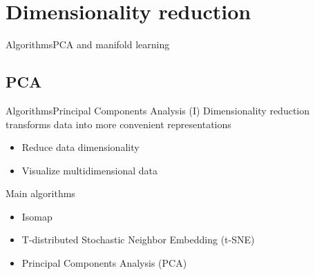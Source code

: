 \documentclass[10pt,compress]{beamer} %
\begin{document}
\section{Dimensionality reduction}
{
\sectionheaderWhite %
\begin{frame}{Algorithms}{PCA and manifold learning}
\end{frame}
}

\subsection{PCA}

\begin{frame}{Algorithms}{Principal Components Analysis (I)}
	Dimensionality reduction transforms data into more convenient representations
	\begin{itemize}
		\item Reduce data dimensionality
		\item Visualize multidimensional data
	\end{itemize}

	Main algorithms
	\begin{itemize}
		\item Isomap
		\item T-distributed Stochastic Neighbor Embedding (t-SNE)
		\item Principal Components Analysis (PCA)
	\end{itemize}

\end{frame}
\end{document}

